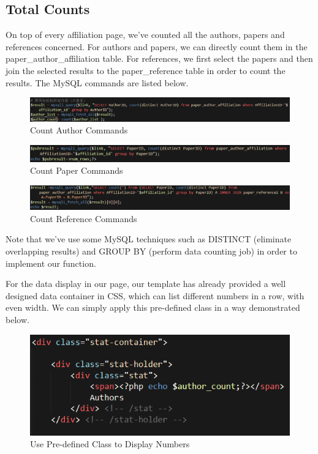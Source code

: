 \documentclass{book}
\begin{document}
\subsection {Total Counts}
On top of every affiliation page, we've counted all the authors, papers and references concerned. For authors and papers, we can directly count them in the paper\_author\_affiliation table. For references, we first select the papers and then join the selected results to the paper\_reference table in order to count the results. The MySQL commands are listed below.

\begin{figure}[H]
\centering
\includegraphics[scale=0.55]{img/zlt_aff_authorcount.png}
\caption{Count Author Commands}
\label{fig:aff_authorcount}
\end{figure}
\begin{figure}[H]
\centering
\includegraphics[scale=0.6]{img/zlt_aff_papercount.png}
\caption{Count Paper Commands}
\label{fig:aff_papercount}
\end{figure}
\begin{figure}[H]
\centering
\includegraphics[scale=0.55]{img/zlt_aff_refcount.png}
\caption{Count Reference Commands}
\label{fig:aff_refcount}
\end{figure}

Note that we've use some MySQL techniques such as DISTINCT (eliminate overlapping results) and GROUP BY (perform data counting job) in order to implement our function.

For the data display in our page, our template has already provided a well designed data container in CSS, which can list different numbers in a row, with even width. We can simply apply this pre-defined class in a way demonstrated below.

\begin{figure}[H]
\centering
\includegraphics[scale=0.8]{img/zlt_aff_countdisplay.png}
\caption{Use Pre-defined Class to Display Numbers}
\end{figure}
\end{document}
